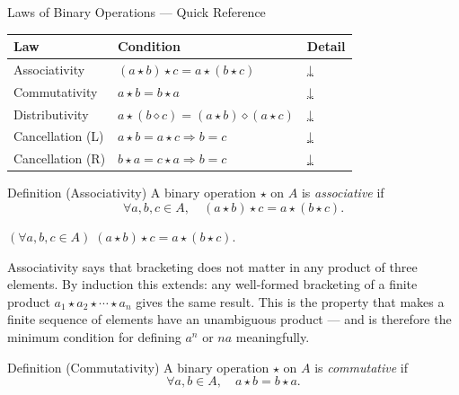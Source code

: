 \begin{toolkitbox}{Laws of Binary Operations — Quick Reference}
\small
\begin{tabular}{l l l}
\toprule
\textbf{Law} & \textbf{Condition} & \textbf{Detail} \\
\midrule
Associativity    & $(a \star b) \star c = a \star (b \star c)$         & \hyperref[def:associativity]{↓} \\
Commutativity    & $a \star b = b \star a$                             & \hyperref[def:commutativity]{↓} \\
Distributivity   & $a \star (b \diamond c) = (a \star b) \diamond (a \star c)$ & \hyperref[def:distributivity]{↓} \\
Cancellation (L) & $a \star b = a \star c \Rightarrow b = c$           & \hyperref[def:cancellation]{↓} \\
Cancellation (R) & $b \star a = c \star a \Rightarrow b = c$           & \hyperref[def:cancellation]{↓} \\
\bottomrule
\end{tabular}
\end{toolkitbox}


\begin{definitionbox}{Definition (Associativity)}
\label{def:associativity}
A binary operation $\star$ on $A$ is \emph{associative} if
\[
  \forall a, b, c \in A,\quad (a \star b) \star c = a \star (b \star c).
\]
\end{definitionbox}

\begin{remark}
$(\forall a, b, c \in A)\;(a \star b) \star c = a \star (b \star c)$.
\end{remark}

\begin{remark}
Associativity says that bracketing does not matter in any product of three
elements.
By induction this extends: any well-formed bracketing of a finite product
$a_1 \star a_2 \star \cdots \star a_n$ gives the same result.
This is the property that makes a finite sequence of elements have an
unambiguous product — and is therefore the minimum condition for defining
$a^n$ or $na$ meaningfully.
\end{remark}

\begin{definitionbox}{Definition (Commutativity)}
\label{def:commutativity}
A binary operation $\star$ on $A$ is \emph{commutative} if
\[
  \forall a, b \in A,\quad a \star b = b \star a.
\]
\end{definitionbox}


